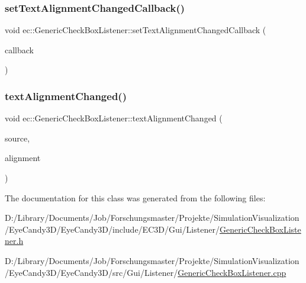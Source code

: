 \subsubsection{\texorpdfstring{set\+Text\+Alignment\+Changed\+Callback()}{setTextAlignmentChangedCallback()}}
{\footnotesize\ttfamily void ec\+::\+Generic\+Check\+Box\+Listener\+::set\+Text\+Alignment\+Changed\+Callback (\begin{DoxyParamCaption}\item[{const \mbox{\hyperlink{classec_1_1_generic_check_box_listener_ab297fca8dea2b6edefe0c8d97c24c090}{Text\+Alignment\+Changed\+\_\+\+Callback}} \&}]{callback }\end{DoxyParamCaption})}

\mbox{\label{classec_1_1_generic_check_box_listener_abe00afb238e730d9e88c14e540f209ca}} 
\subsubsection{\texorpdfstring{text\+Alignment\+Changed()}{textAlignmentChanged()}}
{\footnotesize\ttfamily void ec\+::\+Generic\+Check\+Box\+Listener\+::text\+Alignment\+Changed (\begin{DoxyParamCaption}\item[{agui\+::\+Check\+Box $\ast$}]{source,  }\item[{agui\+::\+Area\+Alignment\+Enum}]{alignment }\end{DoxyParamCaption})\hspace{0.3cm}{\ttfamily [override]}}



The documentation for this class was generated from the following files\+:\begin{DoxyCompactItemize}
\item 
D\+:/\+Library/\+Documents/\+Job/\+Forschungsmaster/\+Projekte/\+Simulation\+Visualization/\+Eye\+Candy3\+D/\+Eye\+Candy3\+D/include/\+E\+C3\+D/\+Gui/\+Listener/\mbox{\hyperlink{_generic_check_box_listener_8h}{Generic\+Check\+Box\+Listener.\+h}}\item 
D\+:/\+Library/\+Documents/\+Job/\+Forschungsmaster/\+Projekte/\+Simulation\+Visualization/\+Eye\+Candy3\+D/\+Eye\+Candy3\+D/src/\+Gui/\+Listener/\mbox{\hyperlink{_generic_check_box_listener_8cpp}{Generic\+Check\+Box\+Listener.\+cpp}}\end{DoxyCompactItemize}
